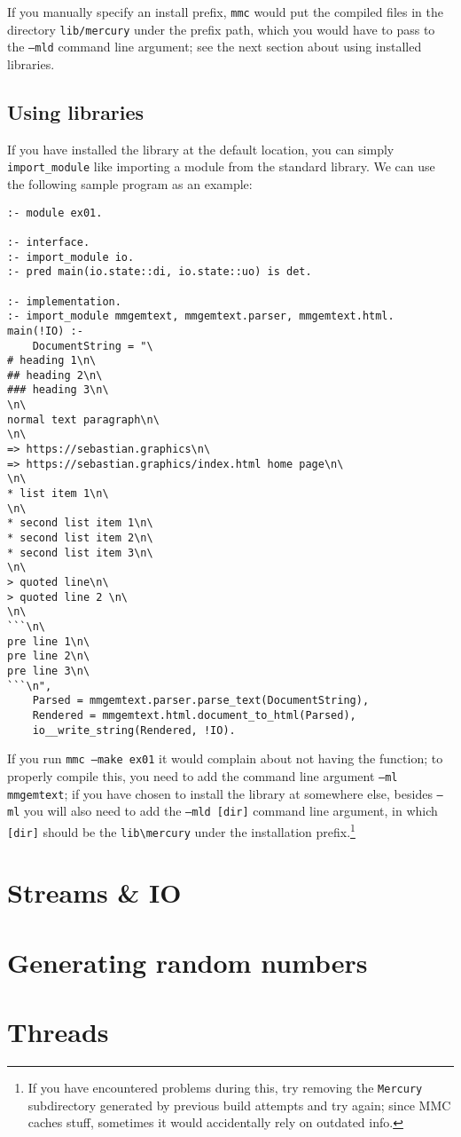 If you manually specify an install prefix, \texttt{mmc} would put the compiled files in the directory \texttt{lib/mercury} under the prefix path, which you would have to pass to the \texttt{--mld} command line argument; see the next section about using installed libraries.

\subsection{Using libraries}

If you have installed the library at the default location, you can simply \texttt{import_module} like importing a module from the standard library. We can use the following sample program as an example:

\begin{lstlisting}[language=Mercury]
:- module ex01.

:- interface.
:- import_module io.
:- pred main(io.state::di, io.state::uo) is det.

:- implementation.
:- import_module mmgemtext, mmgemtext.parser, mmgemtext.html.
main(!IO) :-
	DocumentString = "\
# heading 1\n\
## heading 2\n\
### heading 3\n\
\n\
normal text paragraph\n\
\n\
=> https://sebastian.graphics\n\
=> https://sebastian.graphics/index.html home page\n\
\n\
* list item 1\n\
\n\
* second list item 1\n\
* second list item 2\n\
* second list item 3\n\
\n\
> quoted line\n\
> quoted line 2 \n\
\n\
```\n\
pre line 1\n\
pre line 2\n\
pre line 3\n\
```\n",
	Parsed = mmgemtext.parser.parse_text(DocumentString),
    Rendered = mmgemtext.html.document_to_html(Parsed),
	io__write_string(Rendered, !IO).
\end{lstlisting}

If you run \texttt{mmc --make ex01} it would complain about not having the function; to properly compile this, you need to add the command line argument \texttt{--ml mmgemtext}; if you have chosen to install the library at somewhere else, besides \texttt{--ml} you will also need to add the \texttt{--mld [dir]} command line argument, in which \texttt{[dir]} should be the \texttt{lib\textbackslash mercury} under the installation prefix.\footnote{If you have encountered problems during this, try removing the \texttt{Mercury} subdirectory generated by previous build attempts and try again; since MMC caches stuff, sometimes it would accidentally rely on outdated info.}


\section{Streams \& IO}

\section{Generating random numbers}

\section{Threads}




